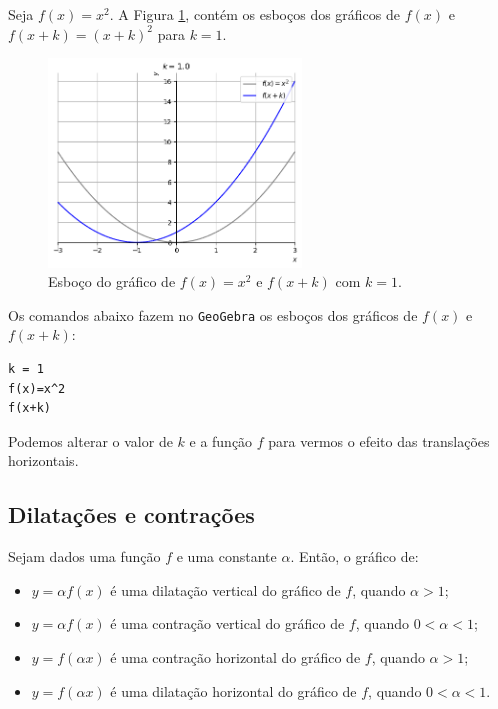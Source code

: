 \documentclass[../main.tex]{subfiles}
\begin{document}
\begin{ex}
  Seja $f(x) = x^2$. A Figura \ref{fig:ex_transhoriz}, contém os esboços dos gráficos de $f(x)$ e $f(x+k) = (x+k)^2$ para $k=1$.

  \begin{figure}[H]
    \centering
    \includegraphics[width=0.6\textwidth]{fig_func/fig_ex_transhoriz}
    \caption{Esboço do gráfico de $f(x) = x^2$ e $f(x+k)$ com $k=1$.}
    \label{fig:ex_transhoriz}
  \end{figure}

  
Os comandos abaixo fazem no  \verb+GeoGebra+  os esboços dos gráficos de $f(x)$ e $f(x+k)$:
\begin{verbatim}
k = 1
f(x)=x^2
f(x+k)
\end{verbatim}
  Podemos alterar o valor de $k$ e a função $f$ para vermos o efeito das translações horizontais.
  
\end{ex}
\subsection{Dilatações e contrações}
Sejam dados uma função $f$ e uma constante $\alpha$. Então, o gráfico de:
\begin{itemize}
\item $y = \alpha f(x)$ é uma dilatação vertical do gráfico de $f$, quando $\alpha > 1$;
\item $y = \alpha f(x)$ é uma contração vertical do gráfico de $f$, quando $0<\alpha < 1$;
\item $y = f(\alpha x)$ é uma contração horizontal do gráfico de $f$, quando $\alpha > 1$;
\item $y = f(\alpha x)$ é uma dilatação horizontal do gráfico de $f$, quando $0<\alpha < 1$.
\end{itemize}
\end{document}
